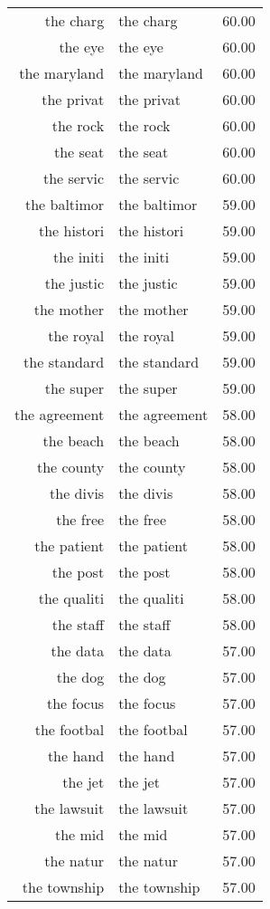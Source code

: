 \begin{table}[ht]
\begin{tabular}{rlr}
  the charg & the charg & 60.00 \\ 
  the eye & the eye & 60.00 \\ 
  the maryland & the maryland & 60.00 \\ 
  the privat & the privat & 60.00 \\ 
  the rock & the rock & 60.00 \\ 
  the seat & the seat & 60.00 \\ 
  the servic & the servic & 60.00 \\ 
  the baltimor & the baltimor & 59.00 \\ 
  the histori & the histori & 59.00 \\ 
  the initi & the initi & 59.00 \\ 
  the justic & the justic & 59.00 \\ 
  the mother & the mother & 59.00 \\ 
  the royal & the royal & 59.00 \\ 
  the standard & the standard & 59.00 \\ 
  the super & the super & 59.00 \\ 
  the agreement & the agreement & 58.00 \\ 
  the beach & the beach & 58.00 \\ 
  the county & the county & 58.00 \\ 
  the divis & the divis & 58.00 \\ 
  the free & the free & 58.00 \\ 
  the patient & the patient & 58.00 \\ 
  the post & the post & 58.00 \\ 
  the qualiti & the qualiti & 58.00 \\ 
  the staff & the staff & 58.00 \\ 
  the data & the data & 57.00 \\ 
  the dog & the dog & 57.00 \\ 
  the focus & the focus & 57.00 \\ 
  the footbal & the footbal & 57.00 \\ 
  the hand & the hand & 57.00 \\ 
  the jet & the jet & 57.00 \\ 
  the lawsuit & the lawsuit & 57.00 \\ 
  the mid & the mid & 57.00 \\ 
  the natur & the natur & 57.00 \\ 
  the township & the township & 57.00 \\ 

\end{tabular}
\end{table}
